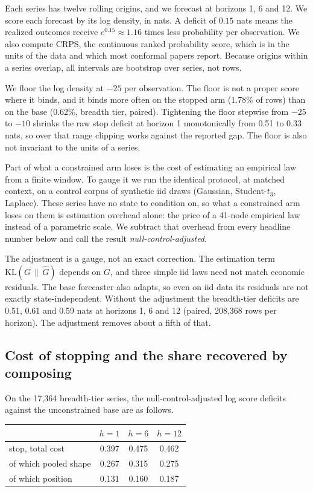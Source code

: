 \documentclass[11pt]{article}
\theoremstyle{remark}
\newcommand{\KLop}{\mathrm{KL}}
\begin{document}
Each series has twelve rolling origins,
and we forecast at horizons 1, 6 and 12. We score each forecast by its log density, in nats. A
deficit of $0.15$ nats means the realized outcomes receive $e^{0.15}\approx1.16$
times less probability per observation. We also compute CRPS, the continuous ranked
probability score, which is in the units of the data and which most conformal papers
report. Because origins within a
series overlap, all intervals are bootstrap over series, not rows.

We floor the log density at $-25$ per observation. The floor is not a
proper score where it binds, and it binds more often on the stopped arm (1.78\% of
rows) than on the base (0.62\%, breadth tier, paired). Tightening the floor stepwise
from $-25$ to $-10$ shrinks the raw stop deficit at horizon 1 monotonically from 0.51
to 0.33 nats, so over that range clipping works against the reported gap. The floor is
also not invariant to the units of a series.

Part of what a constrained arm loses is the cost of estimating an empirical law
from a finite window. To gauge it we run the identical protocol, at matched context,
on a control corpus of synthetic iid draws (Gaussian, Student-$t_3$, Laplace). These
series have no state to condition on, so what a constrained arm loses on them is
estimation overhead alone: the price of a 41-node empirical law instead of a
parametric scale. We subtract that overhead from every headline number below and call
the result \emph{null-control-adjusted}.

The adjustment is a gauge, not an exact correction. The estimation term $\KLop(G\,\|\,\widehat G)$ depends on $G$, and three
simple iid laws need not match economic residuals. The base forecaster also adapts,
so even on iid data its residuals are not exactly state-independent. Without the
adjustment the breadth-tier deficits are 0.51, 0.61 and 0.59 nats at horizons 1, 6
and 12 (paired, 208{,}368 rows per horizon). The adjustment removes about a fifth of
that.

\subsection{Cost of stopping and the share recovered by composing}\label{sec:decomp}

On the 17{,}364 breadth-tier series, the null-control-adjusted log score deficits
against the unconstrained base are as follows.

\begin{center}
\begin{tabular}{lccc}
\toprule
 & $h{=}1$ & $h{=}6$ & $h{=}12$ \\
\midrule
stop, total cost            & 0.397 & 0.475 & 0.462 \\
\quad of which pooled shape & 0.267 & 0.315 & 0.275 \\
\quad of which position     & 0.131 & 0.160 & 0.187 \\
\bottomrule
\end{tabular}
\end{center}
\end{document}
